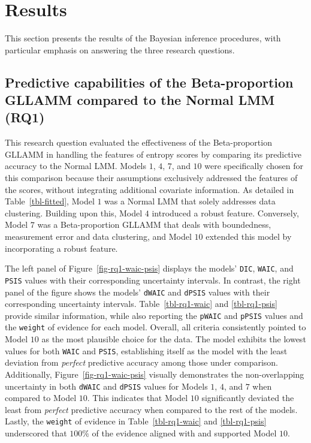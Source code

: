 \documentclass[
  authoryear,
  preprint,
  1p]{elsarticle}
\begin{document}
\section{Results}\label{sec-results}

This section presents the results of the Bayesian inference procedures,
with particular emphasis on answering the three research questions.

\subsection{Predictive capabilities of the Beta-proportion GLLAMM
compared to the Normal LMM (RQ1)}\label{sec-R-RQ1}

This research question evaluated the effectiveness of the
Beta-proportion GLLAMM in handling the features of entropy scores by
comparing its predictive accuracy to the Normal LMM. Models \(1\),
\(4\), \(7\), and \(10\) were specifically chosen for this comparison
because their assumptions exclusively addressed the features of the
scores, without integrating additional covariate information. As
detailed in Table~\ref{tbl-fitted}, Model \(1\) was a Normal LMM that
solely addresses data clustering. Building upon this, Model \(4\)
introduced a robust feature. Conversely, Model \(7\) was a
Beta-proportion GLLAMM that deals with boundedness, measurement error
and data clustering, and Model \(10\) extended this model by
incorporating a robust feature.

The left panel of Figure~\ref{fig-rq1-waic-psis} displays the models'
\texttt{DIC}, \texttt{WAIC}, and \texttt{PSIS} values with their
corresponding uncertainty intervals. In contrast, the right panel of the
figure shows the models' \texttt{dWAIC} and \texttt{dPSIS} values with
their corresponding uncertainty intervals. Table~\ref{tbl-rq1-waic} and
\ref{tbl-rq1-psis} provide similar information, while also reporting the
\texttt{pWAIC} and \texttt{pPSIS} values and the \texttt{weight} of
evidence for each model. Overall, all criteria consistently pointed to
Model \(10\) as the most plausible choice for the data. The model
exhibits the lowest values for both \texttt{WAIC} and \texttt{PSIS},
establishing itself as the model with the least deviation from
\emph{perfect} predictive accuracy among those under comparison.
Additionally, Figure~\ref{fig-rq1-waic-psis} visually demonstrates the
non-overlapping uncertainty in both \texttt{dWAIC} and \texttt{dPSIS}
values for Models \(1\), \(4\), and \(7\) when compared to Model \(10\).
This indicates that Model \(10\) significantly deviated the least from
\emph{perfect} predictive accuracy when compared to the rest of the
models. Lastly, the \texttt{weight} of evidence in
Table~\ref{tbl-rq1-waic} and \ref{tbl-rq1-psis} underscored that
\(100\%\) of the evidence aligned with and supported Model \(10\).
\end{document}
